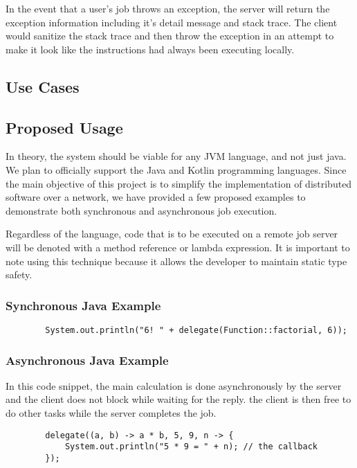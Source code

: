 \documentclass[12pt, oneside,english]{article}
\begin{document}
    In the event that a user's job throws an exception, the server will return
    the exception information including it's detail message and stack trace.
    The client would sanitize the stack trace and then throw the exception
    in an attempt to make it look like the instructions had always been
    executing locally.

    \subsection{Use Cases}\label{subsec:useCases}


    \subsection{Proposed Usage}\label{subsec:proposageUsage}
    In theory, the system should be viable for any JVM language, and not just java.
    We plan to officially support the Java and Kotlin programming languages.
    Since the main objective of this project is to simplify the implementation
    of distributed software over a network, we have provided a few proposed
    examples to demonstrate both synchronous and asynchronous job execution.

    Regardless of the language, code that is to be executed on a remote job
    server will be denoted with a method reference or lambda expression.
    It is important to note using this technique because it allows the developer
    to maintain static type safety.

    \subsubsection{Synchronous Java Example}

    \begin{lstlisting}
        System.out.println("6! " + delegate(Function::factorial, 6));
    \end{lstlisting}

    \subsubsection{Asynchronous Java Example}

    In this code snippet, the main calculation is done asynchronously
    by the server and the client does not block while waiting for the reply.
    the client is then free to do other tasks while the server completes the job.

    \begin{lstlisting}
        delegate((a, b) -> a * b, 5, 9, n -> {
            System.out.println("5 * 9 = " + n); // the callback
        });
    \end{lstlisting}
\end{document}
